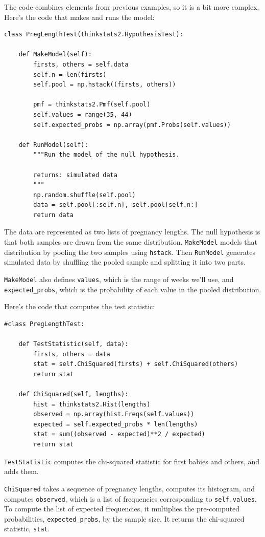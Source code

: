 \documentclass[12pt]{book}
\begin{document}
The code combines elements from previous examples, so it is
a bit more complex.  Here's the code that makes and runs the model:

\begin{verbatim}
class PregLengthTest(thinkstats2.HypothesisTest):

    def MakeModel(self):
        firsts, others = self.data
        self.n = len(firsts)
        self.pool = np.hstack((firsts, others))

        pmf = thinkstats2.Pmf(self.pool)
        self.values = range(35, 44)
        self.expected_probs = np.array(pmf.Probs(self.values))

    def RunModel(self):
        """Run the model of the null hypothesis.

        returns: simulated data
        """
        np.random.shuffle(self.pool)
        data = self.pool[:self.n], self.pool[self.n:]
        return data
\end{verbatim}

The data are represented as two lists of pregnancy lengths.  The null
hypothesis is that both samples are drawn from the same distribution.
{\tt MakeModel} models that distribution by pooling the two
samples using {\tt hstack}.  Then {\tt RunModel} generates
simulated data by shuffling the pooled sample and splitting it
into two parts.

{\tt MakeModel} also defines {\tt values}, which is the
range of weeks we'll use, and \verb"expected_probs",
which is the probability of each value in the pooled distribution.

Here's the code that computes the test statistic:

\begin{verbatim}
#class PregLengthTest:

    def TestStatistic(self, data):
        firsts, others = data
        stat = self.ChiSquared(firsts) + self.ChiSquared(others)
        return stat

    def ChiSquared(self, lengths):
        hist = thinkstats2.Hist(lengths)
        observed = np.array(hist.Freqs(self.values))
        expected = self.expected_probs * len(lengths)
        stat = sum((observed - expected)**2 / expected)
        return stat
\end{verbatim}

{\tt TestStatistic} computes the chi-squared statistic for
first babies and others, and adds them.

{\tt ChiSquared} takes a sequence of pregnancy lengths, computes
its histogram, and computes {\tt observed}, which is a list of
frequencies corresponding to {\tt self.values}.
To compute the list of expected frequencies, it multiplies the
pre-computed probabilities, \verb"expected_probs", by the sample
size.  It returns the chi-squared statistic, {\tt stat}.
\end{document}
